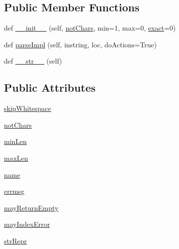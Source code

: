 \subsection*{Public Member Functions}
\begin{DoxyCompactItemize}
\item 
def \hyperlink{classpip_1_1__vendor_1_1pyparsing_1_1CharsNotIn_aceca15651bf501cef1d924b754ff2d5d}{\+\_\+\+\_\+init\+\_\+\+\_\+} (self, \hyperlink{classpip_1_1__vendor_1_1pyparsing_1_1CharsNotIn_aa00b17c5b91635b583f47674223f04fa}{not\+Chars}, min=1, max=0, \hyperlink{namespacepip_1_1__vendor_1_1pyparsing_a42c1593fb4acbba6a25348303fae2aa1}{exact}=0)
\item 
def \hyperlink{classpip_1_1__vendor_1_1pyparsing_1_1CharsNotIn_aadb2f7d416d0f1d093f2123892edd58a}{parse\+Impl} (self, instring, loc, do\+Actions=True)
\item 
def \hyperlink{classpip_1_1__vendor_1_1pyparsing_1_1CharsNotIn_aa2b66198733e003d876a445a199ade34}{\+\_\+\+\_\+str\+\_\+\+\_\+} (self)
\end{DoxyCompactItemize}
\subsection*{Public Attributes}
\begin{DoxyCompactItemize}
\item 
\hyperlink{classpip_1_1__vendor_1_1pyparsing_1_1CharsNotIn_a2e6a47b1707a3d580859c2bbc29ec233}{skip\+Whitespace}
\item 
\hyperlink{classpip_1_1__vendor_1_1pyparsing_1_1CharsNotIn_aa00b17c5b91635b583f47674223f04fa}{not\+Chars}
\item 
\hyperlink{classpip_1_1__vendor_1_1pyparsing_1_1CharsNotIn_a1114c5bbe809af588b33f97578dc3ef6}{min\+Len}
\item 
\hyperlink{classpip_1_1__vendor_1_1pyparsing_1_1CharsNotIn_a28bb6f958840f41314dfafb6da7b24c1}{max\+Len}
\item 
\hyperlink{classpip_1_1__vendor_1_1pyparsing_1_1CharsNotIn_ab3e14d1637887354370821b262410d51}{name}
\item 
\hyperlink{classpip_1_1__vendor_1_1pyparsing_1_1CharsNotIn_ad572f7e8eb357de3768922b3a56ecfad}{errmsg}
\item 
\hyperlink{classpip_1_1__vendor_1_1pyparsing_1_1CharsNotIn_a0a727b93edac9243814ec360883dbe79}{may\+Return\+Empty}
\item 
\hyperlink{classpip_1_1__vendor_1_1pyparsing_1_1CharsNotIn_acb9176026183af5b2a012812e7424637}{may\+Index\+Error}
\item 
\hyperlink{classpip_1_1__vendor_1_1pyparsing_1_1CharsNotIn_a150902ed98aaac4cf12c5652eb0267f2}{str\+Repr}
\end{DoxyCompactItemize}
